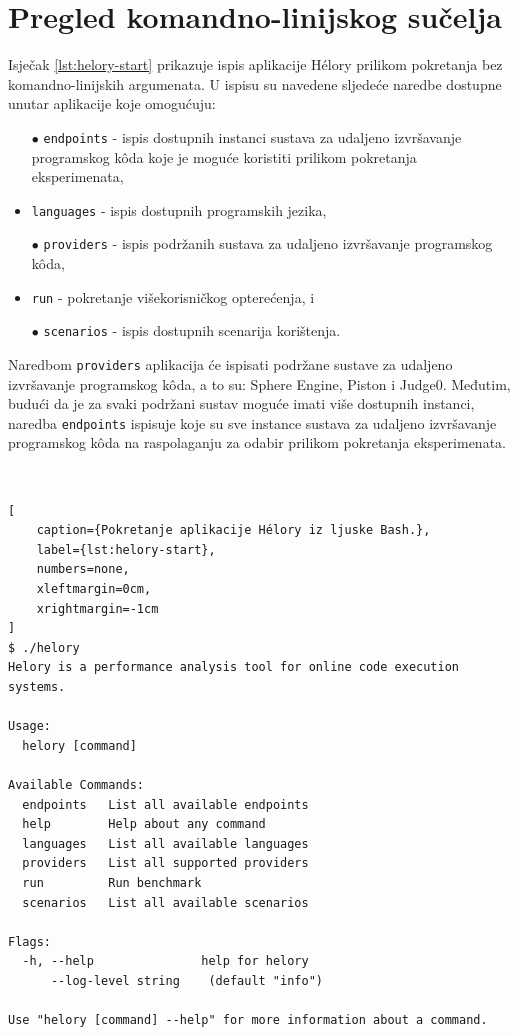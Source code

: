 \documentclass[times, utf8, diplomski]{fer}
\begin{document}
\section{Pregled komandno-linijskog sučelja}
Isječak \ref{lst:helory-start} prikazuje ispis aplikacije Hélory prilikom pokretanja bez komandno-linijskih argumenata. U ispisu su navedene sljedeće naredbe dostupne unutar aplikacije koje omogućuju:
\begin{itemize}
    \item[$\bullet$] \lstinline{endpoints} - ispis dostupnih instanci sustava za udaljeno izvršavanje programskog kôda koje je moguće koristiti prilikom pokretanja eksperimenata,
    \item[$\bullet$] \lstinline{languages} - ispis dostupnih programskih jezika,
    \item[$\bullet$] \lstinline{providers} - ispis podržanih sustava za udaljeno izvršavanje programskog kôda,
    \item[$\bullet$] \lstinline{run} - pokretanje višekorisničkog opterećenja, i
    \item[$\bullet$] \lstinline{scenarios} - ispis dostupnih scenarija korištenja.
\end{itemize}

Naredbom \lstinline{providers} aplikacija će ispisati podržane sustave za udaljeno izvršavanje programskog kôda, a to su: Sphere Engine, Piston i Judge0. Međutim, budući da je za svaki podržani sustav moguće imati više dostupnih instanci, naredba \lstinline{endpoints} ispisuje koje su sve instance sustava za udaljeno izvršavanje programskog kôda na raspolaganju za odabir prilikom pokretanja eksperimenata. 

\

\begin{lstlisting}[
    caption={Pokretanje aplikacije Hélory iz ljuske Bash.},
    label={lst:helory-start},
    numbers=none,
    xleftmargin=0cm,
    xrightmargin=-1cm
]
$ ./helory
Helory is a performance analysis tool for online code execution systems.

Usage:
  helory [command]

Available Commands:
  endpoints   List all available endpoints
  help        Help about any command
  languages   List all available languages
  providers   List all supported providers
  run         Run benchmark
  scenarios   List all available scenarios

Flags:
  -h, --help               help for helory
      --log-level string    (default "info")

Use "helory [command] --help" for more information about a command.
\end{lstlisting}
\end{document}
